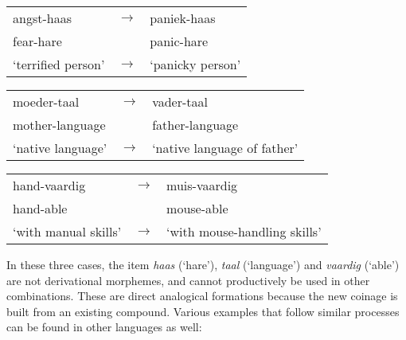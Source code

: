 
\begin{exe}
    \ex
    \begin{xlist}
        \ex
        \begin{tabular}[t]{lcl}
          angst-haas           & $\rightarrow$ & paniek-haas                  \\
          fear-hare            &               & panic-hare                   \\
          `terrified person'   & $\rightarrow$ & `panicky person'             \\
        \end{tabular}
        \ex
        \begin{tabular}[t]{lcl}
          moeder-taal          & $\rightarrow$ & vader-taal                   \\
          mother-language      &               & father-language              \\
          `native language'    & $\rightarrow$ & `native language of father'  \\
        \end{tabular}
        \ex
        \begin{tabular}[t]{lcl}
          hand-vaardig         & $\rightarrow$ & muis-vaardig                 \\
          hand-able            &               & mouse-able                   \\
          `with manual skills' & $\rightarrow$ & `with mouse-handling skills' \\
        \end{tabular}
    \end{xlist}
\end{exe}

In these three cases, the item \textit{haas} (`hare'), \textit{taal} (`language') and \textit{vaardig} (`able') are not derivational morphemes, and cannot productively be used in other combinations. These are direct analogical formations because the new coinage is built from an existing compound. Various examples that follow similar processes can be found in other languages as well:


